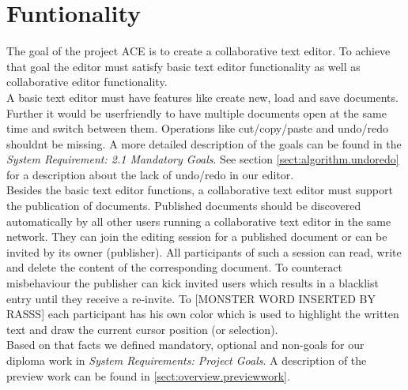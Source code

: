 \chapter{Funtionality}
\label{chapter:functionality}

The goal of the project ACE is to create a collaborative text editor. To achieve that goal the editor must satisfy basic text editor functionality as well as collaborative editor functionality.\\

A basic text editor must have features like create new, load and save documents. Further it would be userfriendly to have multiple documents open at the same time and switch between them. Operations like cut/copy/paste and undo/redo shouldnt be missing. A more detailed description of the goals can be found in the \textit{System Requirement: 2.1 Mandatory Goals}. See section \ref{sect:algorithm.undoredo} for a description about the lack of undo/redo in our editor.\\

Besides the basic text editor functions, a collaborative text editor must support the publication of documents. Published documents should be discovered automatically by all other users running a collaborative text editor in the same network. They can join the editing session for a published document or can be invited by its owner (publisher). All participants of such a session can read, write and delete the content of the corresponding document. To counteract misbehaviour the publisher can kick invited users which results in a blacklist entry until they receive a re-invite. To [MONSTER WORD INSERTED BY RASSS] each participant has his own color which is used to highlight the written text and draw the current cursor position (or selection).\\

Based on that facts we defined mandatory, optional and non-goals for our diploma work in \textit{System Requirements: Project Goals}. A description of the preview work can be found in \ref{sect:overview.previewwork}.
